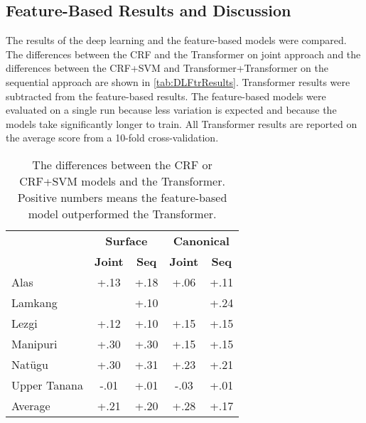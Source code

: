 \subsection{Feature-Based Results and Discussion}
\label{sec:sgFtrAnalysis}

The results of the deep learning and the feature-based models were compared. The differences between the CRF and the Transformer on joint approach and the differences between the CRF+SVM and Transformer+Transformer on the sequential approach are shown in \autoref{tab:DLFtrResults}. Transformer results were subtracted from the feature-based results. The feature-based models were evaluated on a single run because less variation is expected and because the models take significantly longer to train. All Transformer results are reported on the average score from a 10-fold cross-validation. 

\begin{table}[!tb]
    \centering
    \begin{tabular}{l|cc|cc}
        & \multicolumn{2}{c|}{\textbf{Surface}} & \multicolumn{2}{c}{\textbf{Canonical}} \\
        & \textbf{Joint} & \textbf{Seq} & \textbf{Joint} & \textbf{Seq} \\
        \hline
        Alas & +.13 & +.18 & +.06 & +.11 \\
        \hline
        Lamkang &  & +.10 &  & +.24 \\
        \hline
        Lezgi & +.12 & +.10 & +.15 & +.15 \\
        \hline
        Manipuri & +.30 & +.30 & +.15 & +.15 \\
        \hline
        Nat\"ugu & +.30 & +.31 & +.23 & +.21 \\
        \hline
        Upper Tanana & -.01 & +.01 & -.03 & +.01 \\
        \hline
        \hline
        Average & +.21 & +.20 & +.28 & +.17 \\
    \end{tabular}
    \caption[F$_1$-score Differences of Feature-based Models minus Deep Learning]{The differences between the CRF or CRF+SVM models and the Transformer. Positive numbers means the feature-based model outperformed the Transformer.}
    \label{tab:DLFtrResults}
\end{table}

